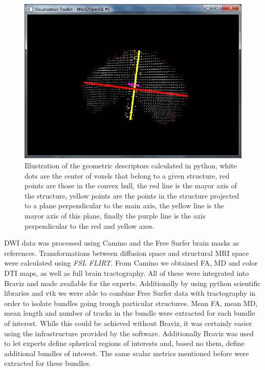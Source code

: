 \begin{figure}
	\centering
		\includegraphics[width=\textwidth]{figures/kmc400/desc_4}
	\caption{Illustration of the geometric descriptors calculated in python, white dots are the center of voxels that belong to a given structure, red points are those in the convex hull, the red line is the mayor axis of the structure, yellow points are the points in the structure projected to a plane perpendicular to the main axis, the yellow line is the mayor axis of this plane, finally the purple line is the axis perpendicular to the red and yellow axes.}
	\label{fig_jth_descs}
\end{figure}

DWI data was processed using Camino and the Free Surfer brain masks as references. Transformations between diffusion space and structural MRI space were calculated using \emph{FSL FLIRT}. From Camino we obtained FA, MD and color DTI maps, as well as full brain tractography. All of these were integrated into Braviz and made available for the experts. Additionally by using python scientific libraries and vtk we were able to combine Free Surfer data with tractography in order to isolate bundles going trough particular structures. Mean FA, mean MD, mean length and number of tracks in the bundle were extracted for each bundle of interest.  While this could be achieved without Braviz, it was certainly easier using the infrastructure provided by the software. Additionally Braviz was used to let experts define spherical regions of interests and, based no them, define additional bundles of interest. The same scalar metrics mentioned before were extracted for these bundles. 

